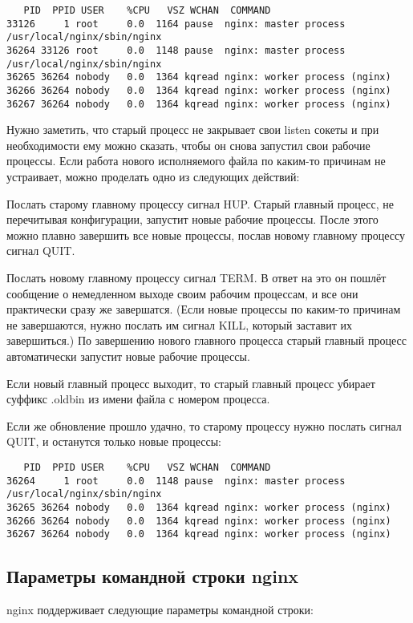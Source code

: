 \documentclass[a4paper,10pt,twoside]{article}
\begin{document}
\begin{verbatim}
   PID  PPID USER    %CPU   VSZ WCHAN  COMMAND
33126     1 root     0.0  1164 pause  nginx: master process /usr/local/nginx/sbin/nginx
36264 33126 root     0.0  1148 pause  nginx: master process /usr/local/nginx/sbin/nginx
36265 36264 nobody   0.0  1364 kqread nginx: worker process (nginx)
36266 36264 nobody   0.0  1364 kqread nginx: worker process (nginx)
36267 36264 nobody   0.0  1364 kqread nginx: worker process (nginx)
\end{verbatim} 
Нужно заметить, что старый процесс не закрывает свои listen сокеты и при необходимости ему можно сказать, чтобы он снова запустил свои рабочие процессы. Если работа нового исполняемого файла по каким-то причинам не устраивает, можно проделать одно из следующих действий:

Послать старому главному процессу сигнал HUP. Старый главный процесс, не перечитывая конфигурации, запустит новые рабочие процессы. После этого можно плавно завершить все новые процессы, послав новому главному процессу сигнал QUIT.

Послать новому главному процессу сигнал TERM. В ответ на это он пошлёт сообщение о немедленном выходе своим рабочим процессам, и все они практически сразу же завершатся. (Если новые процессы по каким-то причинам не завершаются, нужно послать им сигнал KILL, который заставит их завершиться.) По завершению нового главного процесса старый главный процесс автоматически запустит новые рабочие процессы.

Если новый главный процесс выходит, то старый главный процесс убирает суффикс .oldbin из имени файла с номером процесса.

Если же обновление прошло удачно, то старому процессу нужно послать сигнал QUIT, и останутся только новые процессы:

\begin{verbatim}
   PID  PPID USER    %CPU   VSZ WCHAN  COMMAND
36264     1 root     0.0  1148 pause  nginx: master process /usr/local/nginx/sbin/nginx
36265 36264 nobody   0.0  1364 kqread nginx: worker process (nginx)
36266 36264 nobody   0.0  1364 kqread nginx: worker process (nginx)
36267 36264 nobody   0.0  1364 kqread nginx: worker process (nginx)
\end{verbatim} 


\subsection{Параметры командной строки nginx}
nginx поддерживает следующие параметры командной строки:
\end{document}
